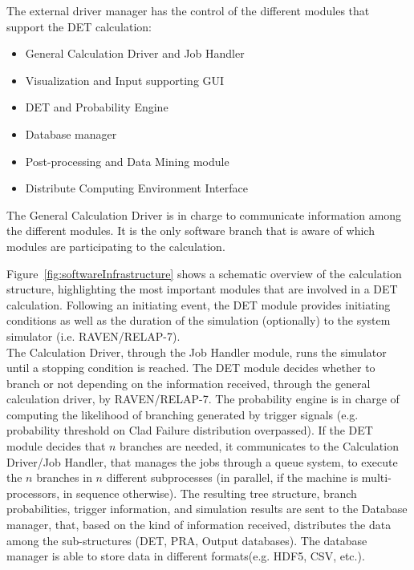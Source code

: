 \documentclass{mc2013}
\begin{document}
The external driver manager has the control of the different modules that support the DET calculation:
\vspace{-5mm}
\begin{itemize}
\itemsep0em
\item General Calculation Driver and Job Handler
\item Visualization and Input supporting GUI
\item DET and Probability Engine
\item Database manager
\item Post-processing and Data Mining module
\item Distribute Computing Environment Interface
\end{itemize}
\vspace{-5mm}
The General Calculation Driver is in charge to communicate information among the different modules. It is the only software branch that is aware of which modules are participating to the calculation.   

Figure~\ref{fig:softwareInfrastructure} shows a schematic overview of the calculation structure, highlighting the most important modules that are involved in a DET calculation. Following an initiating event, the DET module provides initiating conditions as well as the duration of the simulation (optionally) to the system simulator (i.e. RAVEN/RELAP-7). 
\\The Calculation Driver, through the Job Handler module, runs the simulator until a stopping condition is reached. The DET module decides whether to branch or not depending on the information received, through the general calculation driver, by RAVEN/RELAP-7. 
The probability engine is in charge of computing the likelihood of branching generated by trigger signals (e.g. probability threshold on Clad Failure distribution overpassed).  If the DET module decides that $n$ branches are needed, it communicates to the Calculation Driver/Job Handler, that manages the jobs through a queue system, to execute the $n$ branches in $n$ different subprocesses (in parallel, if the machine is multi-processors, in sequence otherwise). The resulting tree structure, branch probabilities, trigger information, and simulation results are sent to the Database manager, that, based on the kind of information received, distributes the data among the sub-structures (DET, PRA, Output databases). The database manager is able to store data in different formats(e.g. HDF5, CSV, etc.). 
\end{document}
